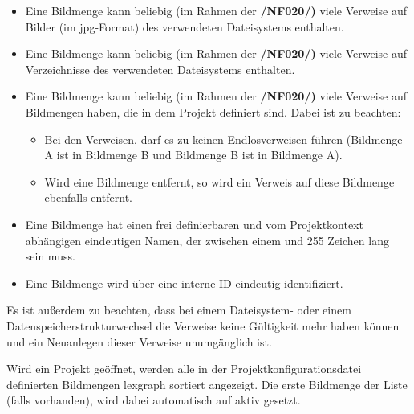 	\begin{itemize}
		
		\item Eine Bildmenge kann beliebig (im Rahmen der \textbf{/NF020/)} viele Verweise auf Bilder (im \gls{jpg}-Format) des verwendeten Dateisystems enthalten.
		
		\item Eine Bildmenge kann beliebig (im Rahmen der \textbf{/NF020/)} viele Verweise auf Verzeichnisse des verwendeten Dateisystems enthalten.
		
		\item Eine Bildmenge kann beliebig (im Rahmen der \textbf{/NF020/)} viele Verweise auf Bildmengen haben, die in dem Projekt definiert sind. Dabei ist zu beachten:
		
			\begin{itemize}
			
				\item Bei den Verweisen, darf es zu keinen Endlosverweisen führen (Bildmenge A ist in Bildmenge B und Bildmenge B ist in Bildmenge A).
				
				\item Wird eine Bildmenge entfernt, so wird ein Verweis auf diese Bildmenge ebenfalls entfernt.
			
			\end{itemize}
		
		\item Eine Bildmenge hat einen frei definierbaren und vom Projektkontext abhängigen eindeutigen Namen, der zwischen einem und 255 Zeichen lang sein muss.
		
		\item Eine Bildmenge wird über eine interne ID eindeutig identifiziert.
	
	\end{itemize}
	
	Es ist außerdem zu beachten, dass bei einem Dateisystem- oder einem Datenspeicherstrukturwechsel die Verweise keine Gültigkeit mehr haben können und ein Neuanlegen dieser Verweise unumgänglich ist.\par Wird ein Projekt geöffnet, werden alle in der Projektkonfigurationsdatei definierten Bildmengen \gls{lexgraph} sortiert angezeigt. Die erste Bildmenge der Liste (falls vorhanden), wird dabei automatisch auf aktiv gesetzt.
	

